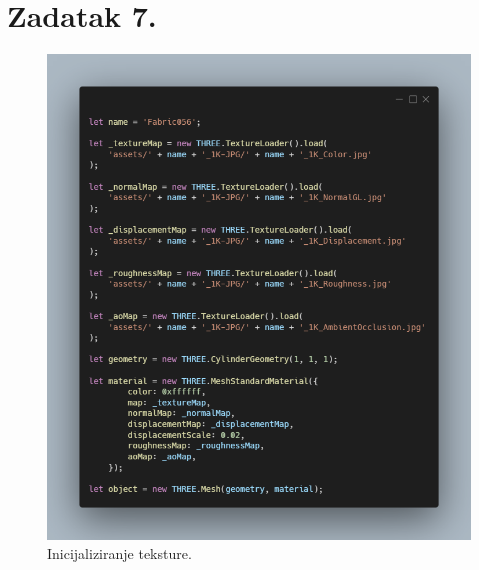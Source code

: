 \documentclass[a4paper,12pt]{article}
\begin{document}
\section*{Zadatak 7.}
\begin{figure}[ht]
    \centering
    \includegraphics[scale=0.5]{image/zadatak7.png}
    \caption{Inicijaliziranje teksture.}
\end{figure}
\end{document}
